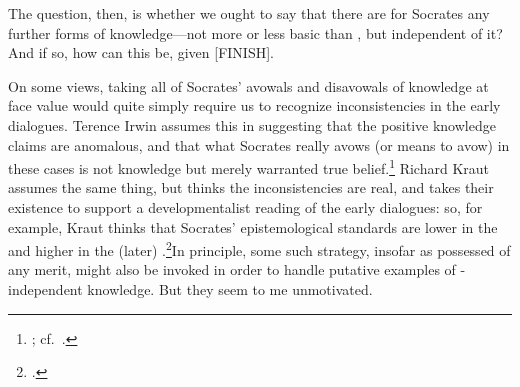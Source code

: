 \documentclass[11pt,letterpaper,oneside]{amsart} %
\begin{document}













The question, then, is whether we ought to say that there are for Socrates any further forms of knowledge---not more or less basic than \techne, but independent of it? And if so, how can this be, given [FINISH].



On some views, taking all of Socrates' avowals and disavowals of knowledge at face value would quite simply require us to recognize inconsistencies in the early dialogues. Terence Irwin assumes this in suggesting that the positive knowledge claims are anomalous, and that what Socrates really avows (or means to avow) in these cases is not knowledge but merely warranted true belief.\footnote{\citet[p.\ XX]{irwin1977pmt}; cf.\ \citet[pp.\ 28--9]{irwin1995pse}.} Richard Kraut assumes the same thing, but thinks the inconsistencies are real, and takes their existence to support a developmentalist reading of the early dialogues: so, for example, Kraut thinks that Socrates' epistemological standards are lower in the  and higher in the (later) .\footnote{\citet[p.\ XX]{kraut1984sas}.}In principle, some such strategy, insofar as possessed of any merit, might also be invoked in order to handle putative examples of \techne-independent knowledge. But they seem to me unmotivated.

\end{document}
